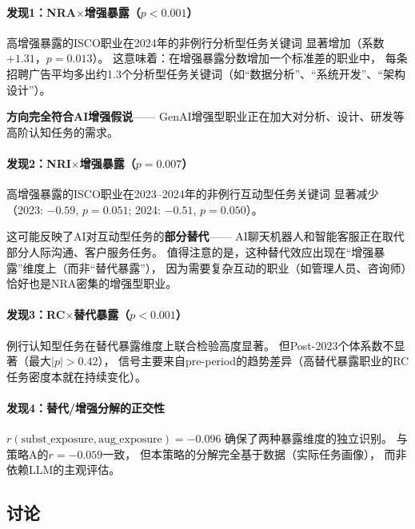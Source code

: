 \documentclass[12pt,a4paper]{ctexart}
\begin{document}
\paragraph{发现1：NRA$\times$增强暴露（$p<0.001$）}

高增强暴露的ISCO职业在2024年的非例行分析型任务关键词
显著增加（系数$+1.31$，$p=0.013$）。
这意味着：在增强暴露分数增加一个标准差的职业中，
每条招聘广告平均多出约1.3个分析型任务关键词（如``数据分析''、``系统开发''、``架构设计''）。

\textbf{方向完全符合AI增强假说}——
GenAI增强型职业正在加大对分析、设计、研发等高阶认知任务的需求。

\paragraph{发现2：NRI$\times$增强暴露（$p=0.007$）}

高增强暴露的ISCO职业在2023--2024年的非例行互动型任务关键词
显著减少（2023: $-0.59$, $p=0.051$; 2024: $-0.51$, $p=0.050$）。

这可能反映了AI对互动型任务的\textbf{部分替代}——
AI聊天机器人和智能客服正在取代部分人际沟通、客户服务任务。
值得注意的是，这种替代效应出现在``增强暴露''维度上（而非``替代暴露''），
因为需要复杂互动的职业（如管理人员、咨询师）恰好也是NRA密集的增强型职业。

\paragraph{发现3：RC$\times$替代暴露（$p<0.001$）}

例行认知型任务在替代暴露维度上联合检验高度显著。
但Post-2023个体系数不显著（最大$|p|>0.42$），
信号主要来自pre-period的趋势差异（高替代暴露职业的RC任务密度本就在持续变化）。

\paragraph{发现4：替代/增强分解的正交性}

$r(\text{subst\_exposure}, \text{aug\_exposure}) = -0.096$
确保了两种暴露维度的独立识别。
与策略A的$r=-0.059$一致，
但本策略的分解完全基于数据（实际任务画像），
而非依赖LLM的主观评估。

\subsection{讨论}
\end{document}
